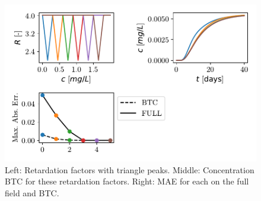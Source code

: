 \begin{figure}[h]
    \centering
    \includegraphics{figs/triangle_ret_pertubation.pdf}
    \caption{Left: Retardation factors with triangle peaks. Middle: Concentration BTC for these retardation factors. Right: MAE for each on the full field and BTC.}
    \label{fig:triangle_ret_pertubation}
\end{figure}